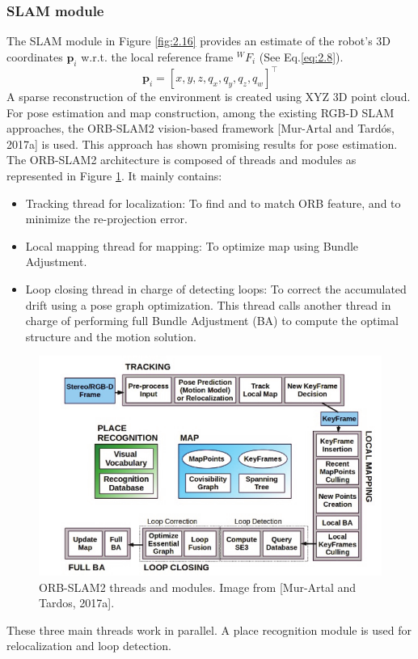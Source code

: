 \subsubsection{SLAM module}
The SLAM module in Figure \ref{fig:2.16} provides an estimate of the robot’s 3D coordinates $\mathbf{p}_i$ w.r.t. the local reference frame $^WF_i$ (See Eq.\ref{eq:2.8}).
\begin{equation}\label{eq:2.8}
    \mathbf{p}_i=[x,y,z,q_x,q_y,q_z,q_w]^\top
\end{equation}
A sparse reconstruction of the environment is created using XYZ 3D point cloud. For pose estimation and map construction, among the existing RGB-D SLAM approaches, the ORB-SLAM2 vision-based framework [Mur-Artal and Tardós, 2017a] is used. This approach has shown promising results for pose estimation. The ORB-SLAM2 architecture is composed of threads and modules as represented in Figure \ref{fig:2.17}. It mainly contains:
\begin{itemize}
    \item Tracking thread for localization: To ﬁnd and to match ORB feature, and to minimize the re-projection error.
    \item Local mapping thread for mapping: To optimize map using Bundle Adjustment.
    \item Loop closing thread in charge of detecting loops: To correct the accumulated drift using a pose graph optimization. This thread calls another thread in charge of performing full Bundle Adjustment (BA) to compute the optimal structure and the motion solution.
\end{itemize}
\begin{figure}[H]
    \centering
    \includegraphics[scale=0.5]{assets/2_17.png}
    \caption{ORB-SLAM2 threads and modules. Image from [Mur-Artal and Tardos, 2017a].}
    \label{fig:2.17}
\end{figure}
These three main threads work in parallel. A place recognition module is used for relocalization and loop detection.
